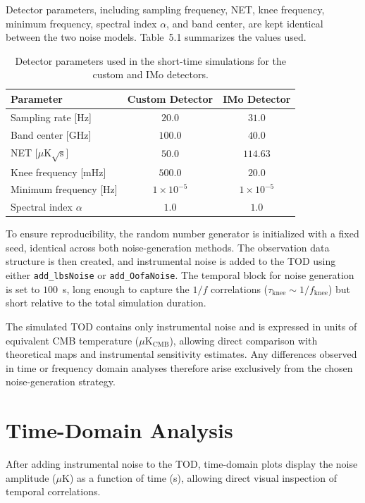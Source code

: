 Detector parameters, including sampling frequency, NET, knee frequency, minimum frequency, spectral index $\alpha$, and band center, are kept identical between the two noise models. Table~5.1 summarizes the values used.

\begin{table}[h]
\centering
\begin{tabular}{lcc}
\hline
\textbf{Parameter} & \textbf{Custom Detector} & \textbf{IMo Detector} \\
\hline
Sampling rate [Hz] & $20.0$ & $31.0$ \\
Band center [GHz] & $100.0$ & $40.0$ \\
NET [$\mu$K$\sqrt{\mathrm{s}}$] & $50.0$ & $114.63$ \\
Knee frequency [mHz] & $500.0$ & $20.0$ \\
Minimum frequency [Hz] & $1\times10^{-5}$ & $1\times10^{-5}$ \\
Spectral index $\alpha$ & $1.0$ & $1.0$ \\
\hline
\end{tabular}
\caption{Detector parameters used in the short-time simulations for the custom and IMo detectors.}
\end{table}

To ensure reproducibility, the random number generator is initialized with a fixed seed, identical across both noise-generation methods. The observation data structure is then created, and instrumental noise is added to the TOD using either \texttt{add\_lbsNoise} or \texttt{add\_OofaNoise}. The temporal block for noise generation is set to $100$~s, long enough to capture the $1/f$ correlations ($\tau_\text{knee} \sim 1/f_\text{knee}$) but short relative to the total simulation duration. 

The simulated TOD contains only instrumental noise and is expressed in units of equivalent CMB temperature ($\mu$K$_\mathrm{CMB}$), allowing direct comparison with theoretical maps and instrumental sensitivity estimates. Any differences observed in time or frequency domain analyses therefore arise exclusively from the chosen noise-generation strategy.




\section{Time-Domain Analysis}

After adding instrumental noise to the TOD, time-domain plots display the noise amplitude ($\mu$K) as a function of time (s), allowing direct visual inspection of temporal correlations.

